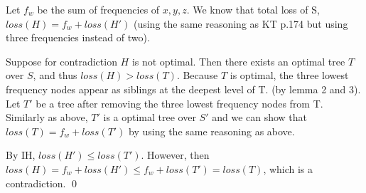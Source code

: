 Let $f_w$ be the sum of frequencies of $x, y, z$.
We know that total loss of S, $loss(H) = f_w + loss(H')$ 
(using the same reasoning as KT p.174 but using three frequencies instead of two).

Suppose for contradiction $H$ is not optimal.
Then there exists an optimal tree $T$ over $S$, and thus $loss(H) > loss(T)$.
Because $T$ is optimal, the three lowest frequency nodes appear as siblings at the deepest level of T.
(by lemma 2 and 3).
Let $T'$ be a tree after removing the three lowest frequency nodes from T. 
Similarly as above, $T'$ is a optimal tree over $S'$ and we can show that 
$loss(T) = f_w + loss(T')$ by using the same reasoning as above.

By IH, $loss(H') \leq loss(T')$. However, then $loss(H) = f_w + loss(H') \leq f_w + loss(T') = loss(T)$, which is a contradiction. \qed




